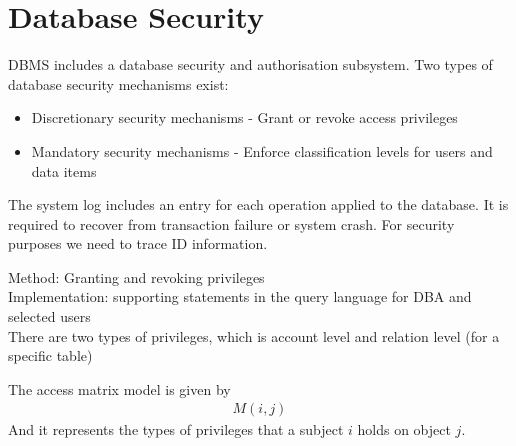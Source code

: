 \documentclass[a4paper]{article}
\theoremstyle{plain}
\theoremstyle{definition}
\newtheorem{defn}{Definition}[section]
\theoremstyle{remark}
\begin{document}
\section{Database Security}
DBMS includes a database security and authorisation subsystem. Two types of database security mechanisms exist:
\begin{itemize}
	\item Discretionary security mechanisms - Grant or revoke access privileges
	\item Mandatory security mechanisms - Enforce classification levels for users and data items
\end{itemize}
\begin{tcolorbox}[colback=black!3!white,colframe=black!60!white,title=\begin{defn}System Log \label{System Log}\end{defn}]
The system log includes an entry for each operation applied to the database. It is required to recover from transaction failure or system crash. For security purposes we need to trace ID information.
\end{tcolorbox}
\begin{tcolorbox}[colback=black!3!white,colframe=black!60!white,title=\begin{defn}Discretionary Access Control \label{Discretionary Access Control}\end{defn}]
Method: Granting and revoking privileges \\
Implementation: supporting statements in the query language for DBA and selected users \\
There are two types of privileges, which is account level and relation level (for a specific table)
\end{tcolorbox}
\begin{tcolorbox}[colback=black!3!white,colframe=black!60!white,title=\begin{defn}Access Matrix Model \label{Access Matrix Model}\end{defn}]
The access matrix model is given by
\begin{align}
M(i,j)
\end{align}
And it represents the types of privileges that a subject $i$ holds on object $j$.
\end{tcolorbox}
\end{document}
